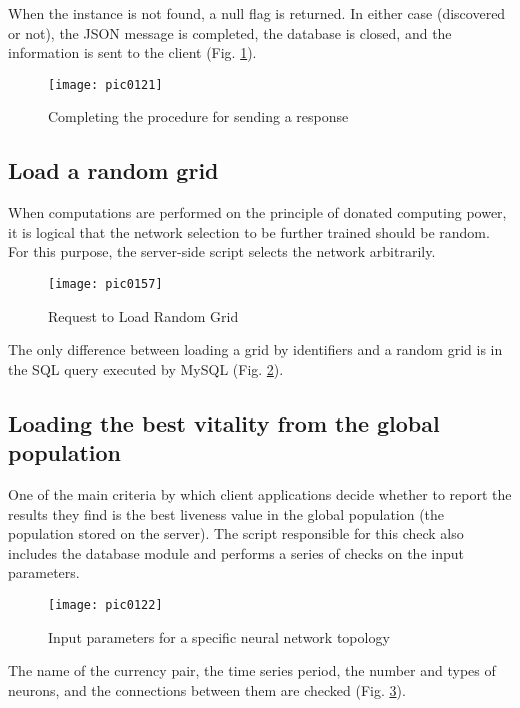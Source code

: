 When the instance is not found, a null flag is returned. In either case (discovered or not), the JSON message is completed, the database is closed, and the information is sent to the client (Fig. \ref{fig:pic0121}).

\begin{figure}[h]
\centering
\texttt{[image: pic0121]}
\caption{Completing the procedure for sending a response}
\label{fig:pic0121}
\end{figure}
\FloatBarrier

\subsection{Load a random grid}

When computations are performed on the principle of donated computing power, it is logical that the network selection to be further trained should be random. For this purpose, the server-side script selects the network arbitrarily.

\begin{figure}[h]
\centering
\texttt{[image: pic0157]}
\caption{Request to Load Random Grid}
\label{fig:pic0157}
\end{figure}
\FloatBarrier

The only difference between loading a grid by identifiers and a random grid is in the SQL query executed by MySQL (Fig. \ref{fig:pic0157}).

\subsection{Loading the best vitality from the global population}

One of the main criteria by which client applications decide whether to report the results they find is the best liveness value in the global population (the population stored on the server). The script responsible for this check also includes the database module and performs a series of checks on the input parameters.

\begin{figure}[h]
\centering
\texttt{[image: pic0122]}
\caption{Input parameters for a specific neural network topology}
\label{fig:pic0122}
\end{figure}
\FloatBarrier

The name of the currency pair, the time series period, the number and types of neurons, and the connections between them are checked (Fig. \ref{fig:pic0122}).

